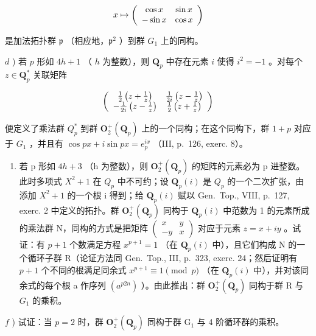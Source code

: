 \[
x \mapsto \left( \begin{array}{c c} \cos x & \sin x \\ - \sin x & \cos x \end{array} \right)
\]

是加法拓扑群 \(\mathfrak{p}\) （相应地，\(\mathfrak{p}^2\) ）到群 \(G_1\) 上的同构。

\(d\) ) 若 \(p\) 形如 \(4h + 1\) （ \(h\) 为整数），则 \(\mathbf{Q}_p\) 中存在元素 \(i\) 使得 \(i^2 = -1\) 。对每个 \(z \in \mathbf{Q}_p^*\) 关联矩阵

\[
\left( \begin{array}{c c} \frac {1}{2} \left(z + \frac {1}{z}\right) & \frac {1}{2 i} \left(z - \frac {1}{z}\right) \\ - \frac {1}{2 i} \left(z - \frac {1}{z}\right) & \frac {1}{2} \left(z + \frac {1}{z}\right) \end{array} \right)
\]

便定义了乘法群 \(Q_{p}^{*}\) 到群 \(\mathbf{O}_{2}^{+}(\mathbf{Q}_{p})\) 上的一个同构；在这个同构下，群 \(1 + p\) 对应于 \(G_{1}\) ，并且有 \(\cos px + i \sin px = e_{p}^{ix}\) （III, p.~126, exerc. 8）。

\begin{enumerate}
\def\labelenumi{\alph{enumi})}
\setcounter{enumi}{4}
\tightlist
\item
  若 p 形如 \(4h + 3\) （h 为整数），则 \(\mathbf{O}_{2}^{+}(\mathbf{Q}_{p})\) 的矩阵的元素必为 p 进整数。此时多项式 \(X^{2} + 1\) 在 \(Q_{p}\) 中不可约；设 \(\mathbf{Q}_{p}(i)\) 是 \(Q_{p}\) 的一个二次扩张，由添加 \(X^{2} + 1\) 的一个根 i 得到；给 \(\mathbf{Q}_{p}(i)\) 赋以 Gen.~Top., VIII, p.~127, exerc. 2 中定义的拓扑。群 \(\mathbf{O}_{2}^{+}(\mathbf{Q}_{p})\) 同构于 \(\mathbf{Q}_{p}(i)\) 中范数为 1 的元素所成的乘法群 N，同构的方式是把矩阵 \(\begin{pmatrix} x & y \\ -y & x \end{pmatrix}\) 对应于元素 \(z = x + iy\) 。试证：有 \(p + 1\) 个数满足方程 \(x^{p+1} = 1\) （在 \(\mathbf{Q}_{p}(i)\) 中），且它们构成 N 的一个循环子群 R（论证方法同 Gen.~Top., III, p.~323, exerc. 24；然后证明有 \(p + 1\) 个不同的根满足同余式 \(x^{p+1} \equiv 1 \pmod{p}\) （在 \(\mathbf{Q}_{p}(i)\) 中），并对该同余式的每个根 a 作序列 \((a^{p2n})\) ）。由此推出：群 \(\mathbf{O}_{2}^{+}(\mathbf{Q}_{p})\) 同构于群 R 与 \(G_{1}\) 的乘积。
\end{enumerate}

\(f\) ) 试证：当 \(p = 2\) 时，群 \(\mathbf{O}_2^+ (\mathbf{Q}_p)\) 同构于群 \(\mathrm{G}_1\) 与 4 阶循环群的乘积。
\relax{}
